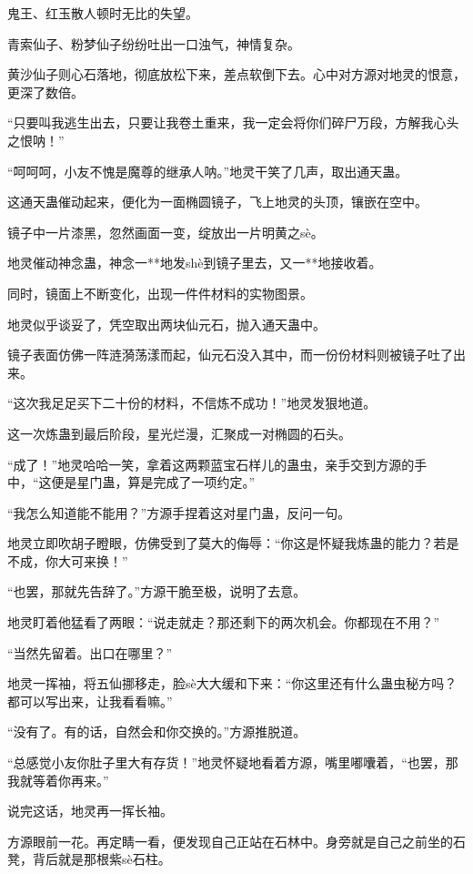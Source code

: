 
\begin{this_body}

鬼王、红玉散人顿时无比的失望。

青索仙子、粉梦仙子纷纷吐出一口浊气，神情复杂。

黄沙仙子则心石落地，彻底放松下来，差点软倒下去。心中对方源对地灵的恨意，更深了数倍。

“只要叫我逃生出去，只要让我卷土重来，我一定会将你们碎尸万段，方解我心头之恨呐！”

“呵呵呵，小友不愧是魔尊的继承人呐。”地灵干笑了几声，取出通天蛊。

这通天蛊催动起来，便化为一面椭圆镜子，飞上地灵的头顶，镶嵌在空中。

镜子中一片漆黑，忽然画面一变，绽放出一片明黄之sè。

地灵催动神念蛊，神念一**地发shè到镜子里去，又一**地接收着。

同时，镜面上不断变化，出现一件件材料的实物图景。

地灵似乎谈妥了，凭空取出两块仙元石，抛入通天蛊中。

镜子表面仿佛一阵涟漪荡漾而起，仙元石没入其中，而一份份材料则被镜子吐了出来。

“这次我足足买下二十份的材料，不信炼不成功！”地灵发狠地道。

这一次炼蛊到最后阶段，星光烂漫，汇聚成一对椭圆的石头。

“成了！”地灵哈哈一笑，拿着这两颗蓝宝石样儿的蛊虫，亲手交到方源的手中，“这便是星门蛊，算是完成了一项约定。”

“我怎么知道能不能用？”方源手捏着这对星门蛊，反问一句。

地灵立即吹胡子瞪眼，仿佛受到了莫大的侮辱：“你这是怀疑我炼蛊的能力？若是不成，你大可来换！”

“也罢，那就先告辞了。”方源干脆至极，说明了去意。

地灵盯着他猛看了两眼：“说走就走？那还剩下的两次机会。你都现在不用？”

“当然先留着。出口在哪里？”

地灵一挥袖，将五仙挪移走，脸sè大大缓和下来：“你这里还有什么蛊虫秘方吗？都可以写出来，让我看看嘛。”

“没有了。有的话，自然会和你交换的。”方源推脱道。

“总感觉小友你肚子里大有存货！”地灵怀疑地看着方源，嘴里嘟囔着，“也罢，那我就等着你再来。”

说完这话，地灵再一挥长袖。

方源眼前一花。再定睛一看，便发现自己正站在石林中。身旁就是自己之前坐的石凳，背后就是那根紫sè石柱。


\end{this_body}
